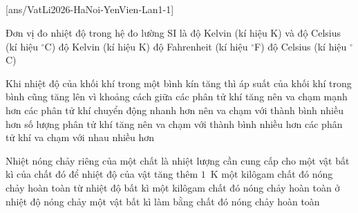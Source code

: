 \def\CheDo{solcolor}%
\def\tenchuong{THPT Yên Viên, Hà Nội -- Lần 1}
\def\thuonghieu{VẬT LÍ 12 -- Eduzy.com.vn}
\def\TachCauDS{1}
\def\TachCauLG{1}




	\noindent
	\subsection*{}
	\setcounter{ex}{0}
	[ans/VatLi2026-HaNoi-YenVien-Lan1-1]

	\begin{ex}%
		Đơn vị đo nhiệt độ trong hệ đo lường SI là
		\choice
		{độ Kelvin (kí hiệu K) và độ Celsius (kí hiệu $^\circ$C)}
		{\True độ Kelvin (kí hiệu K)}
		{độ Fahrenheit (kí hiệu $^\circ$F)}
		{độ Celsius (kí hiệu $^\circ$C)}
	\end{ex}

	\begin{ex}%
		Khi nhiệt độ của khối khí trong một bình kín tăng thì áp suất của khối khí trong bình cũng tăng lên vì
		\choice
		{khoảng cách giữa các phân tử khí tăng nên va chạm mạnh hơn}
		{\True các phân tử khí chuyển động nhanh hơn nên va chạm với thành bình nhiều hơn}
		{số lượng phân tử khí tăng nên va chạm với thành bình nhiều hơn}
		{các phân tử khí va chạm với nhau nhiều hơn}
	\end{ex}

	\begin{ex}%
		Nhiệt nóng chảy riêng của một chất là nhiệt lượng cần cung cấp cho
		\choice
		{một vật bất kì của chất đó để nhiệt độ của vật tăng thêm $1$~K}
		{một kilôgam chất đó nóng chảy hoàn toàn từ nhiệt độ bất kì}
		{\True một kilôgam chất đó nóng chảy hoàn toàn ở nhiệt độ nóng chảy}
		{một vật bất kì làm bằng chất đó nóng chảy hoàn toàn}
	\end{ex}

